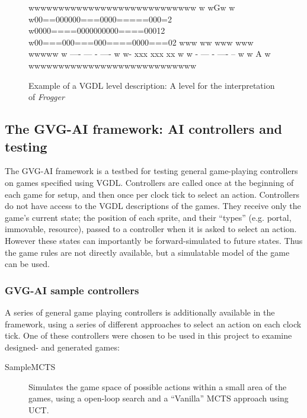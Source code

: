 \documentclass[a4paper,titlepage,final]{report}
\begin{document}
\begin{figure}[!ht]
\centering
\begin{vgdldesc}[linewidth=14cm]
wwwwwwwwwwwwwwwwwwwwwwwwwwww
w           wGw            w
w00==000000===0000=====000=2
w0000====0000000000====00012
w00===000===000====0000===02
www   ww   www    www  wwwww
w   ----   ---   -  ----   w
w-     xxx       xxx    xx w
w -   ---     -   ---- --  w
w       A                  w
wwwwwwwwwwwwwwwwwwwwwwwwwwww
\end{vgdldesc}
\caption{Example of a VGDL level description: A level for the interpretation of \textit{Frogger}}
\label{fig:vgdlgame_level}
\end{figure}



\subsection{The GVG-AI framework: AI controllers and testing}
\label{ssec:aicontrollersandtesting}
The GVG-AI framework is a testbed for testing general game-playing controllers on games specified using VGDL. 
Controllers are called once at the beginning of each game for setup, and then once per clock tick to select an action. 
Controllers do not have access to the VGDL descriptions of the games. They receive only the game's current state; the position of each sprite, and their ``types'' (e.g. portal, immovable, resource), passed to a controller when it is asked to select an action. 
However these states can importantly be forward-simulated to future states. 
Thus the game rules are not directly available, but a simulatable model of the game can be used.

\subsubsection*{GVG-AI sample controllers}
A series of general game playing controllers is additionally available in the framework, using a series of different approaches to select an action on each clock tick.
One of these controllers were chosen to be used in this project to examine designed- and generated games:

\begin{description}
	\item [SampleMCTS] Simulates the game space of possible actions within a small area of the games, using a open-loop search and a ``Vanilla'' MCTS approach using UCT.
\end{description}
\end{document}
